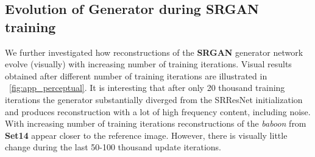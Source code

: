 \documentclass[10pt,twocolumn,letterpaper]{article}
\begin{document}
\clearpage
\subsection{Evolution of Generator during SRGAN training}
\label{app:evolution}
We further investigated how reconstructions of the \textbf{SRGAN} generator network evolve (visually) with increasing number of training iterations. Visual results obtained after different number of training iterations are illustrated in \figurename~\ref{fig:app_perceptual}. It is interesting that after only 20 thousand training iterations the generator substantially diverged from the SRResNet initialization and produces reconstruction with a lot of high frequency content, including noise. With increasing number of training iterations reconstructions of the \textit{baboon} from \textbf{Set14} appear closer to the reference image. However, there is visually little change during the last 50-100 thousand update iterations.
\end{document}
